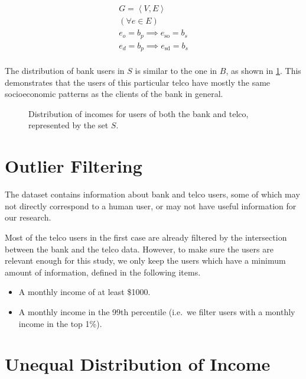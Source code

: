 \begin{equation}
\label{eq:banktelcojoin}
\begin{gathered}
G = \left< V, E \right> \\
( \forall e \in E ) \\
e_o = b_p \implies e_{\operatorname{so}} = b_s \\
e_d = b_p \implies e_{\operatorname{sd}} = b_s \\
\end{gathered}
\end{equation}

The distribution of bank users in $S$ is similar to the one in $B$, as shown in \cref{fig:matchdistribution}. This demonstrates that the users of this particular telco have mostly the same socioeconomic patterns as the clients of the bank in general.

\begin{figure}
\centering
{}
\caption{Distribution of incomes for users of both the bank and telco, represented by the set $S$.}
\label{fig:matchdistribution}
\end{figure}

\section{Outlier Filtering}
\label{subsec:outlier_filtering}

The dataset contains information about bank and telco users, some of which may not directly correspond to a human user, or may not have useful information for our research.

Most of the telco users in the first case are already filtered by the intersection between the bank and the telco data. However, to make sure the users are relevant enough for this study, we only keep the users which have a minimum amount of information, defined in the following items.

\begin{itemize}
	\item A monthly income of at least \$\num{1000}.
	\item A monthly income in the \num{99}th percentile (i.e.\ we filter users with a monthly income in the top 1\%).
\end{itemize}

\section{Unequal Distribution of Income}

